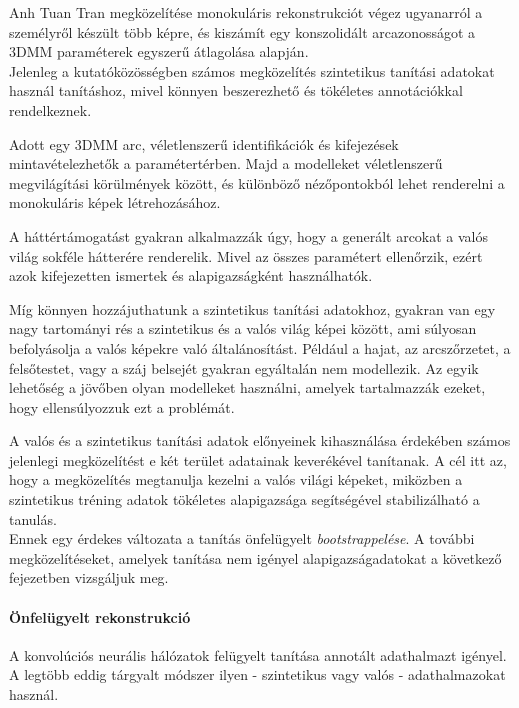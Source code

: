 \documentclass[12pt,a4]{article}
\begin{document}
	Anh Tuan Tran \cite{tran} megközelítése monokuláris rekonstrukciót végez ugyanarról a személyről készült több képre, és kiszámít egy konszolidált arcazonosságot a 3DMM paraméterek egyszerű átlagolása alapján. \\
	
	Jelenleg a kutatóközösségben számos megközelítés szintetikus tanítási adatokat használ tanításhoz, mivel könnyen beszerezhető és tökéletes annotációkkal rendelkeznek. 
	
	Adott egy 3DMM arc, véletlenszerű identifikációk és kifejezések mintavételezhetők a paramétertérben. 
	Majd a modelleket véletlenszerű megvilágítási körülmények között, és különböző nézőpontokból lehet renderelni a monokuláris képek létrehozásához. 
	
	A háttértámogatást gyakran alkalmazzák úgy, hogy a generált arcokat a valós világ sokféle hátterére renderelik. Mivel az összes paramétert ellenőrzik, ezért azok kifejezetten ismertek és alapigazságként használhatók.
	
	Míg könnyen hozzájuthatunk a szintetikus tanítási adatokhoz, gyakran van egy nagy tartományi rés
	a szintetikus és a valós világ képei között, ami súlyosan befolyásolja
	a valós képekre való általánosítást. Például a hajat, az arcszőrzetet, a felsőtestet,
	vagy a száj belsejét gyakran egyáltalán nem modellezik. Az egyik lehetőség
	a jövőben olyan modelleket használni, amelyek tartalmazzák ezeket, hogy ellensúlyozzuk ezt a problémát. 
	
	A valós és a szintetikus tanítási adatok előnyeinek kihasználása érdekében számos jelenlegi megközelítést e két terület adatainak keverékével tanítanak. A cél itt az, hogy a megközelítés megtanulja kezelni a valós világi képeket, miközben a szintetikus tréning adatok tökéletes alapigazsága
	segítségével stabilizálható a tanulás.\\

	Ennek egy érdekes változata
	a tanítás önfelügyelt \textit{bootstrappelése}. A további megközelítéseket, amelyek tanítása nem igényel
	alapigazságadatokat a következő fejezetben vizsgáljuk meg.
	
	\paragraph{Önfelügyelt rekonstrukció}
	A konvolúciós neurális hálózatok felügyelt tanítása annotált adathalmazt igényel. A legtöbb
	eddig tárgyalt módszer ilyen - szintetikus vagy valós - adathalmazokat használ.
	
\end{document}
